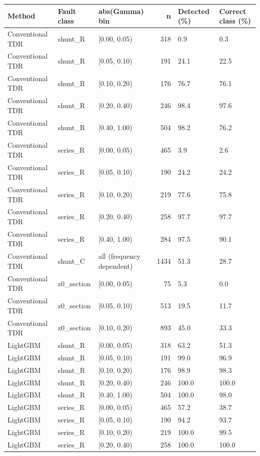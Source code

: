 \begin{tabular}{lllrll}
\toprule
Method & Fault class & abs(Gamma) bin & n & Detected (\%) & Correct class (\%) \\
\midrule
Conventional TDR & shunt\_R & [0.00, 0.05) & 318 & 0.9 & 0.3 \\
Conventional TDR & shunt\_R & [0.05, 0.10) & 191 & 24.1 & 22.5 \\
Conventional TDR & shunt\_R & [0.10, 0.20) & 176 & 76.7 & 76.1 \\
Conventional TDR & shunt\_R & [0.20, 0.40) & 246 & 98.4 & 97.6 \\
Conventional TDR & shunt\_R & [0.40, 1.00) & 504 & 98.2 & 76.2 \\
Conventional TDR & series\_R & [0.00, 0.05) & 465 & 3.9 & 2.6 \\
Conventional TDR & series\_R & [0.05, 0.10) & 190 & 24.2 & 24.2 \\
Conventional TDR & series\_R & [0.10, 0.20) & 219 & 77.6 & 75.8 \\
Conventional TDR & series\_R & [0.20, 0.40) & 258 & 97.7 & 97.7 \\
Conventional TDR & series\_R & [0.40, 1.00) & 284 & 97.5 & 90.1 \\
Conventional TDR & shunt\_C & all (frequency dependent) & 1434 & 51.3 & 28.7 \\
Conventional TDR & z0\_section & [0.00, 0.05) & 75 & 5.3 & 0.0 \\
Conventional TDR & z0\_section & [0.05, 0.10) & 513 & 19.5 & 11.7 \\
Conventional TDR & z0\_section & [0.10, 0.20) & 893 & 45.0 & 33.3 \\
LightGBM & shunt\_R & [0.00, 0.05) & 318 & 63.2 & 51.3 \\
LightGBM & shunt\_R & [0.05, 0.10) & 191 & 99.0 & 96.9 \\
LightGBM & shunt\_R & [0.10, 0.20) & 176 & 98.9 & 98.3 \\
LightGBM & shunt\_R & [0.20, 0.40) & 246 & 100.0 & 100.0 \\
LightGBM & shunt\_R & [0.40, 1.00) & 504 & 100.0 & 98.0 \\
LightGBM & series\_R & [0.00, 0.05) & 465 & 57.2 & 38.7 \\
LightGBM & series\_R & [0.05, 0.10) & 190 & 94.2 & 93.7 \\
LightGBM & series\_R & [0.10, 0.20) & 219 & 100.0 & 99.5 \\
LightGBM & series\_R & [0.20, 0.40) & 258 & 100.0 & 100.0 \\

\end{tabular}
